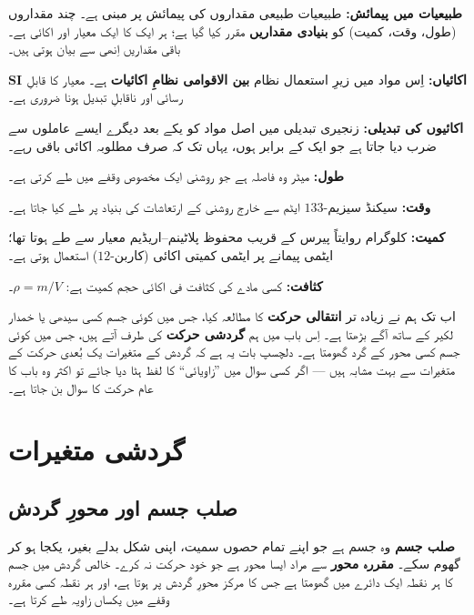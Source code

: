\documentclass{urdu-textbook}
\begin{document}
\textbf{طبیعیات میں پیمائش:} طبیعیات طبیعی مقداروں کی پیمائش پر مبنی ہے۔
چند مقداروں (طول، وقت، کمیت) کو \textbf{بنیادی مقداریں} مقرر کیا گیا ہے؛
ہر ایک کا ایک معیار اور اکائی ہے۔ باقی مقداریں اِنھی سے بیان ہوتی ہیں۔

\textbf{SI اکائیاں:} اِس مواد میں زیرِ استعمال نظام \textbf{بین الاقوامی
نظامِ اکائیات} ہے۔ معیار کا قابلِ رسائی اور ناقابلِ تبدیل ہونا ضروری ہے۔

\textbf{اکائیوں کی تبدیلی:} زنجیری تبدیلی میں اصل مواد کو یکے بعد دیگرے
ایسے عاملوں سے ضرب دیا جاتا ہے جو ایک کے برابر ہوں، یہاں تک کہ صرف
مطلوبہ اکائی باقی رہے۔

\textbf{طول:} میٹر وہ فاصلہ ہے جو روشنی ایک مخصوص وقفے میں طے کرتی ہے۔

\textbf{وقت:} سیکنڈ سیزیم-\(133\) ایٹم سے خارج روشنی کے ارتعاشات کی
بنیاد پر طے کیا جاتا ہے۔

\textbf{کمیت:} کلوگرام روایتاً پیرس کے قریب محفوظ پلاٹینم--اریڈیم معیار
سے طے ہوتا تھا؛ ایٹمی پیمانے پر ایٹمی کمیتی اکائی (کاربن-\(12\)) استعمال
ہوتی ہے۔

\textbf{کثافت:} کسی مادے کی کثافت فی اکائی حجم کمیت ہے: \(\rho = m/V\)۔

\clearpage
{}
اب تک ہم نے زیادہ تر \textbf{انتقالی حرکت}  کا مطالعہ کیا،
جس میں کوئی جسم کسی سیدھی یا خمدار لکیر کے ساتھ آگے بڑھتا ہے۔ اِس باب میں
ہم \textbf{گردشی حرکت}  کی طرف آتے ہیں، جس میں کوئی جسم کسی
محور کے گرد گھومتا ہے۔ دلچسپ بات یہ ہے کہ گردش کے متغیرات یک بُعدی حرکت
کے متغیرات سے بہت مشابہ ہیں --- اگر کسی سوال میں ”زاویائی“ کا لفظ ہٹا
دیا جائے تو اکثر وہ باب  کا عام حرکت کا سوال بن جاتا ہے۔

\hypertarget{ux6afux631ux62fux634ux6cc-ux645ux62aux63aux6ccux631ux627ux62a}{%
\section{گردشی
متغیرات}\label{ux6afux631ux62fux634ux6cc-ux645ux62aux63aux6ccux631ux627ux62a}}

\hypertarget{ux635ux644ux628-ux62cux633ux645-ux627ux648ux631-ux645ux62dux648ux631-ux6afux631ux62fux634}{%
\subsection{صلب جسم اور محورِ
گردش}\label{ux635ux644ux628-ux62cux633ux645-ux627ux648ux631-ux645ux62dux648ux631-ux6afux631ux62fux634}}

\textbf{صلب جسم}  وہ جسم ہے جو اپنے تمام حصوں سمیت، اپنی شکل
بدلے بغیر، یکجا ہو کر گھوم سکے۔ \textbf{مقررہ محور}  سے مراد
ایسا محور ہے جو خود حرکت نہ کرے۔ خالص گردش میں جسم کا ہر نقطہ ایک دائرے
میں گھومتا ہے جس کا مرکز محورِ گردش پر ہوتا ہے، اور ہر نقطہ کسی مقررہ
وقفے میں یکساں زاویہ طے کرتا ہے۔
\end{document}
